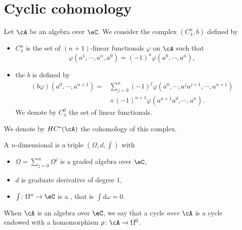 
\section{Cyclic cohomology}
\label{SecCyclicHomol}

Let $\cA$ be an algebra over $\eC$. We consider the complex $(C_{\lambda}^n,b)$ defined by
\begin{itemize}
	\item $C_{\lambda}^n$ is the set of $(n+1)$-linear functionals $\varphi$ on $\cA$ such that
	      \begin{equation}
		      \varphi(a^1,\cdots,a^{n},a^0)=(-1)^n\varphi(a^0,\cdots,a^{n}),
	      \end{equation}
	\item the  $b$ is defined by
	      \begin{equation}
		      \begin{split}
			      (b\varphi)(a^0,\cdots,a^{n+1})=&\sum_{j=0}^{n}(-1)^j\varphi(a^0,\cdots,a^{j}a^{j+1},\cdots,a^{n+1})\\
			      &+(-1)^{n+1}\varphi(a^{n+1}a^0,\cdots,a^{n}).
		      \end{split}
	      \end{equation}
	      We denote by $C^0_{\lambda}$ the set of linear functionals.

\end{itemize}
We denote by $HC^*(\cA)$ the cohomology of this complex.

\begin{definition}		\label{DefCycleCoh}
	A $n$-dimensional  is a triple $(\Omega,d,\int)$ with
	\begin{itemize}
		\item $\Omega=\sum_{j=0}^{n}\Omega^j$ is a graded algebra over $\eC$,
		\item $d$ is  graduate derivative of degree $1$,
		\item $\int\colon \Omega^n\to \eC$ is a , that is $\int d\omega=0$.
	\end{itemize}
	When $\cA$ is an algebra over $\eC$, we say that a cycle \emph{over $\cA$} is a cycle endowed with a homomorphism $\rho\colon \cA\to \Omega^0$.
\end{definition}

